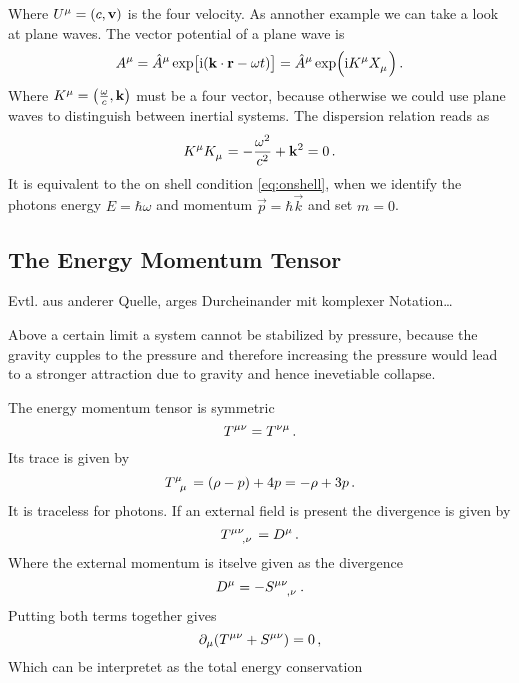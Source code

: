 Where $\tensor{U}{^\mu}=(c,\vec{v})$ is the four velocity. As annother example
we can take a look at plane waves. The vector potential of a plane wave is
\begin{equation}
\tensor{A}{^\mu}=\tensor{\hat{A}}{^\mu}
\exp\left[\imI(\vec{k}\cdot\vec{r}-\omega
t)\right]
=\tensor{\hat{A}}{^\mu}\exp\left(\imI\tensor{K}{^\mu} \tensor{X}{_\mu}\right)\,
.
\end{equation}
Where $\tensor{K}{^\mu}=\left(\frac{\omega}{c},\vec{k}\right)$ must be a four
vector, because otherwise we could use plane waves to distinguish between
inertial systems. The dispersion relation reads as
\begin{equation}
\tensor{K}{^\mu}\tensor{K}{_\mu}=-\frac{\omega^2}{c^2}+\vec{k}^2=0\, .
\end{equation}
It is equivalent to the on shell condition \eqref{eq:onshell}, when we identify
the photons energy $E=\hbar\omega$ and momentum $\vec{p}=\hbar\vec{k}$ and set
$m=0$.
\subsection{The Energy Momentum Tensor}
Evtl. aus anderer Quelle, arges Durcheinander mit komplexer Notation\ldots
\begin{sidenote}
Above a certain limit a system cannot be stabilized by pressure, because the
gravity cupples to the pressure and therefore increasing the pressure would lead
to a stronger attraction due to gravity and hence inevetiable collapse.
\end{sidenote}
The energy momentum tensor is symmetric 
\begin{equation}
\tensor{T}{^\mu^\nu}=\tensor{T}{^\nu^\mu}\, .
\end{equation}
Its trace is given by
\begin{equation}
\tensor{T}{^\mu_\mu}=(\rho-p)+4p=-\rho+3p\, .
\end{equation}
It is traceless for photons. If an external field is present the divergence is
given by
\begin{equation}
\tensor{T}{^\mu^\nu_,_\nu}=\tensor{D}{^\mu}\,  .
\end{equation}
Where the external momentum is itselve given as the divergence 
\begin{equation}
\tensor{D}{^\mu} =-\tensor{S}{^\mu^\nu_,_\nu}\, . 
\end{equation}
Putting both terms together gives
\begin{equation}
\partial_\mu(\tensor{T}{^\mu^\nu}+\tensor{S}{^\mu^\nu})=0\,,
\end{equation}
Which can be interpretet as the total energy conservation
